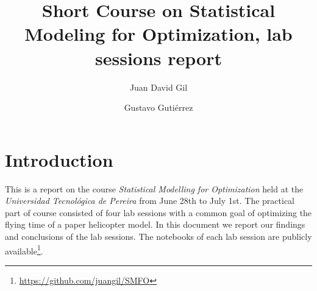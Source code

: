 \documentclass[DIV=20]{scrartcl}
\title{Short Course on Statistical Modeling for Optimization, lab sessions
report}
\author{Juan David Gil \and Gustavo Gutiérrez}
\date{}
\begin{document}
\maketitle
\section{Introduction}
This is a report on the course \emph{Statistical Modelling for Optimization}
held at the \emph{Universidad Tecnológica de Pereira} from June 28th to July
1st. The practical part of course consisted of four lab sessions with a common
goal of optimizing the flying time of a paper helicopter model. In this document
we report our findings and conclusions of the lab sessions. The notebooks of
each lab session are publicly
available\footnote{\url{https://github.com/juangil/SMFO}}.





\end{document}
